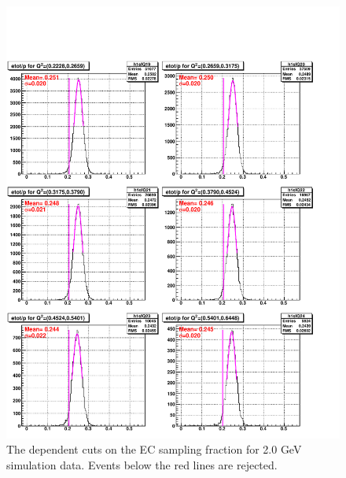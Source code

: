 \begin{figure}[H]%
\centering
\leavevmode \includegraphics[width=1.0\textwidth]{figuresEG4/FigCuts/ecCuts_sfOneD_Eb2_4ThsimN.pdf}  %
\caption[EC sampling fraction cut (Sim.)]{The \qsqs dependent cuts on the EC sampling fraction for 2.0 GeV simulation data. Events below the red lines are rejected.}
\label{ecSfSim6}
\end{figure}



